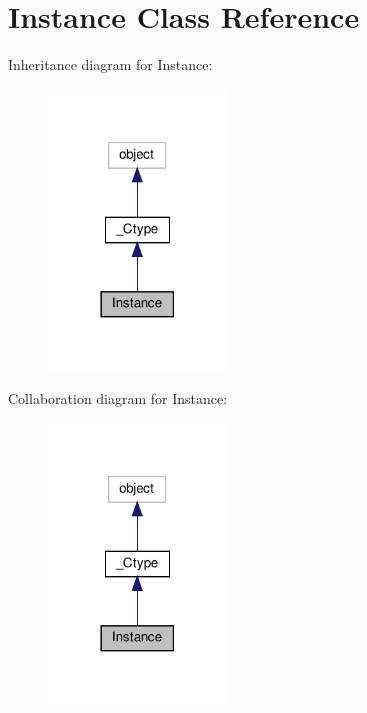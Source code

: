 \hypertarget{classvlc_1_1_instance}{}\section{Instance Class Reference}
\label{classvlc_1_1_instance}


Inheritance diagram for Instance\+:
\nopagebreak
\begin{figure}[H]
\begin{center}
\leavevmode
\includegraphics[width=134pt]{classvlc_1_1_instance__inherit__graph}
\end{center}
\end{figure}


Collaboration diagram for Instance\+:
\nopagebreak
\begin{figure}[H]
\begin{center}
\leavevmode
\includegraphics[width=134pt]{classvlc_1_1_instance__coll__graph}
\end{center}
\end{figure}
